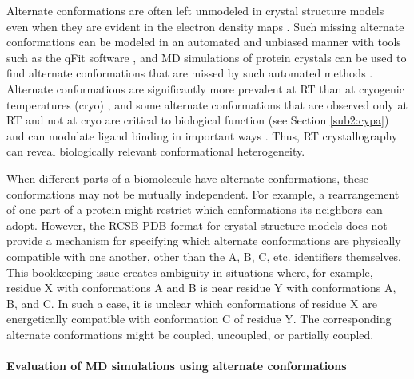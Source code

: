 \documentclass[9pt,review]{livecoms}
\begin{document}
Alternate conformations are often left unmodeled in crystal structure models even when they are evident in the electron density maps \cite{lang_automated_2010}.
Such missing alternate conformations can be modeled in an automated and unbiased manner with tools such as the qFit software \cite{riley_qfit_2021}, and MD simulations of protein crystals can be used to find alternate conformations that are missed by such automated methods \cite{wych_molecular-dynamics_2023}.
Alternate conformations are significantly more prevalent at RT than at cryogenic temperatures (cryo) \cite{fraser_accessing_2011}, and some alternate conformations that are observed only at RT and not at cryo are critical to biological function \cite{fraser_hidden_2009} (see Section \ref{sub2:cypa}) and can modulate ligand binding in important ways \cite{bradford_temperature_2021}.
Thus, RT crystallography can reveal biologically relevant conformational heterogeneity.

When different parts of a biomolecule have alternate conformations, these conformations may not be mutually independent.
For example, a rearrangement of one part of a protein might restrict which conformations its neighbors can adopt.
However, the RCSB PDB format for crystal structure models does not provide a mechanism for specifying which alternate conformations are physically compatible with one another, other than the A, B, C, etc. identifiers themselves.
This bookkeeping issue creates ambiguity in situations where, for example, residue X with conformations A and B is near residue Y with conformations A, B, and C.
In such a case, it is unclear which conformations of residue X are energetically compatible with conformation C of residue Y.
The corresponding alternate conformations might be coupled, uncoupled, or partially coupled.

\paragraph{Evaluation of MD simulations using alternate conformations}
\end{document}
